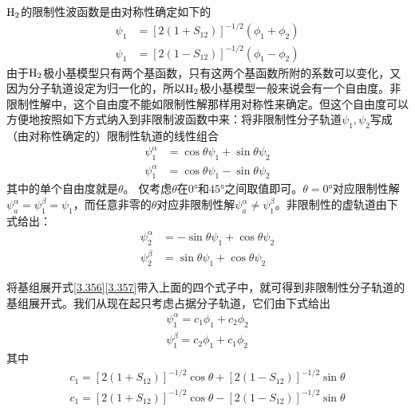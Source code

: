 {$\mathrm{H}_2$的限制性波函数是由对称性确定如下的
\begin{align}
    \psi_1 &= [2(1+S_{12} )]^{-1/2}(\phi_1+\phi_2)
    \label{3.356}
    \\
    \psi_1 &= [2(1-S_{12})]^{-1/2}(\phi_1-\phi_2)
    \label{3.357}
\end{align}
由于$\mathrm{H}_2$极小基模型只有两个基函数，只有这两个基函数所附的系数可以变化，又因为分子轨道设定为归一化的，所以$\mathrm{H}_2$极小基模型一般来说会有一个自由度。非限制性解中，这个自由度不能如限制性解那样用对称性来确定。但这个自由度可以方便地按照如下方式纳入到非限制波函数中来：将非限制性分子轨道$\psi_1,\psi_2$写成（由对称性确定的）限制性轨道的线性组合
\begin{align}
    \psi_1^\alpha &= \cos\theta \psi_1 + \sin\theta \psi_2 \\
    \psi_1^\alpha &= \cos\theta \psi_1 - \sin\theta \psi_2 
\end{align}
其中的单个自由度就是$\theta$。 仅考虑$\theta$在$0\text{°}$和$45\text{°}$之间取值即可。$\theta=0\text{°}$对应限制性解$\psi_a^\alpha=\psi_1^\beta=\psi_1$，而任意非零的$\theta$对应非限制性解$\psi_a^\alpha \neq \psi_1^\beta$。非限制性的虚轨道由下式给出：
\begin{align}
\psi_2^\alpha &= - \sin\theta \psi_1 + \cos\theta \psi_2 \label{3.358}\\
\psi_2^\beta &=  \sin\theta \psi_1 + \cos\theta \psi_2 \label{3.359}
\end{align}

将基组展开式\eqref{3.356}\eqref{3.357}带入上面的四个式子中，就可得到非限制性分子轨道的基组展开式。我们从现在起只考虑占据分子轨道，它们由下式给出
\begin{align}
\psi_1^\alpha = c_1\phi_1 + c_2\phi_2 \label{3.362}\\
\psi_1^\beta = c_2\phi_1 + c_1\phi_2 \label{3.363}
\end{align}
其中
\begin{align}
c_1 = [2(1+S_{12} )]^{-1/2}\cos\theta + [2(1 - S_{12} )]^{-1/2}\sin\theta\\
c_1 = [2(1+S_{12} )]^{-1/2}\cos\theta - [2(1 - S_{12} )]^{-1/2}\sin\theta
\end{align}

}
